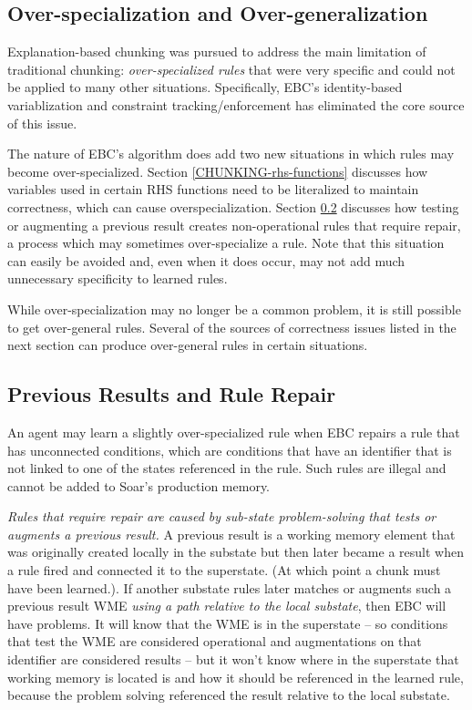 \subsection{Over-specialization and Over-generalization}
\label{CHUNKING-overspecialization}

Explanation-based chunking was pursued to address the main limitation of traditional chunking:  \textit{over-specialized rules} that were very specific and could not be applied to many other situations. Specifically, EBC's identity-based variablization and constraint tracking/enforcement has eliminated the core source of this issue.

The nature of EBC's algorithm does add two new situations in which rules may become over-specialized.  Section \ref{CHUNKING-rhs-functions} discusses how variables used in certain RHS functions need to be literalized to maintain correctness, which can cause overspecialization. Section \ref{CHUNKING-rule-repair} discusses how testing or augmenting a previous result creates non-operational rules that require repair, a process which may sometimes over-specialize a rule.  Note that this situation can easily be avoided and, even when it does occur, may not add much unnecessary specificity to learned rules. 

While over-specialization may no longer be a common problem, it is still possible to get over-general rules.  Several of the sources of correctness issues listed in the next section can produce over-general rules in certain situations.

\subsection{Previous Results and Rule Repair}
\label{CHUNKING-rule-repair}

An agent may learn a slightly over-specialized rule when EBC repairs a rule that has unconnected conditions, which are conditions that have an identifier that is not linked to one of the states referenced in the rule.  Such rules are illegal and cannot be added to Soar's production memory. 

\textit{Rules that require repair are caused by sub-state problem-solving that tests or augments a previous result.}  A previous result is a working memory element that was originally created locally in the substate but then later became a result when a rule fired and connected it to the superstate.  (At which point a chunk must have been learned.). If another substate rules later matches or augments such a previous result WME \emph{using a path relative to the local substate}, then EBC will have problems.  It will know that the WME is in the superstate -- so conditions that test the WME are considered operational and augmentations on that identifier are considered results -- but it won't know where in the superstate that working memory is located is and how it should be referenced in the learned rule, because the problem solving referenced the result relative to the local substate.

